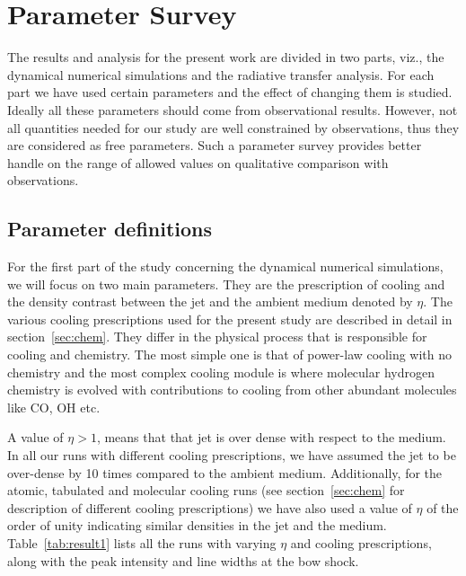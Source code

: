 \documentclass[useAMS,usenatbib]{mn2e}
\begin{document}
    







\section{Parameter Survey}
\label{sec:parasurvey}
The results and analysis for the present work are divided in two parts,
viz., the dynamical numerical simulations and the
radiative transfer analysis. For each part we have used certain parameters
and the effect of changing them is studied. Ideally all these parameters should come from observational
results. However, not all quantities needed for our study are well
constrained by observations, thus they are considered as
free parameters. Such a parameter survey provides better handle on the range of allowed
values on qualitative comparison with observations. 
%

\subsection{Parameter definitions}
\label{ssec:paradef}
For the first part of the study concerning the dynamical numerical
simulations, we will focus on two main parameters. They are the
prescription of cooling and the density contrast between the jet and
the ambient medium denoted by $\eta$. The various cooling prescriptions used for the present study are
described in detail in section~\ref{sec:chem}. They differ in the
physical process that is responsible for cooling and chemistry. The
most simple one is that of power-law cooling with no chemistry and the
most complex cooling module is where molecular hydrogen chemistry is
evolved with contributions to cooling from other abundant molecules
like CO, OH etc. 
%

A value of $\eta > 1$, means that
that jet is over dense with respect to the medium. In all our runs with
different cooling prescriptions, we have assumed the jet to be
over-dense by 10 times compared to the ambient medium. Additionally, for
the atomic, tabulated and molecular cooling runs (see section~\ref{sec:chem}
for description of different cooling prescriptions) we have also used a
value of $\eta$ of the order of unity indicating similar densities in
the jet and the medium. Table~\ref{tab:result1} lists all the runs with
varying $\eta$ and cooling prescriptions, along with the peak
intensity and line widths at the bow shock.
%
\end{document}
